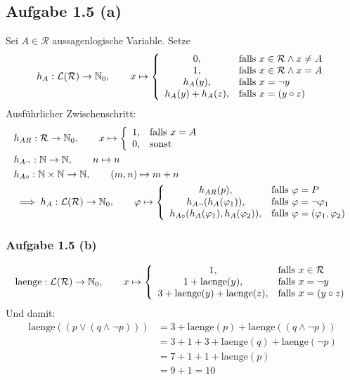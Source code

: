 \subsection*{Aufgabe 1.5 (a)}
Sei $A\in\mathcal{R}$ aussagenlogische Variable. Setze
\begin{align*}
	h_A:\mathcal{L}(\mathcal{R})\to\mathbb{N}_0,\qquad x\mapsto \left\lbrace\begin{array}{cl}
		0, & \text{falls } x\in\mathcal{R}\wedge x\neq A\\
		1, & \text{falls } x\in\mathcal{R}\wedge x=A\\
		h_A(y), & \text{falls } x=\neg y\\
		h_A(y)+h_A(z), & \text{falls } x=(y\circ z)
	\end{array}\right.
\end{align*}
Ausführlicher Zwischenschritt:
\begin{align*}
	&h_{AR}:\mathcal{R}\to\mathbb{N}_0,\qquad x\mapsto \left\lbrace\begin{array}{cl}
		1, & \text{falls } x= A\\
		0, & \text{sonst }
	\end{array}\right.\\
	&h_{A\neg}:\mathbb{N}\to\mathbb{N},\qquad n\mapsto n\\
	&h_{A\circ}:\mathbb{N}\times\mathbb{N}\to\mathbb{N},\qquad(m,n)\mapsto m+n\\
	&\implies h_A:\mathcal{L}(\mathcal{R})\to\mathbb{N}_0,\qquad\varphi\mapsto
	\left\lbrace\begin{array}{cl}
		h_{AR}(p), & \text{falls } \varphi=P\\
		h_{A\neg}(h_A(\varphi_1)), & \text{falls } \varphi=\neg\varphi_1\\
		h_{A\circ}(h_A(\varphi_1),h_A(\varphi_2)), &\text{falls } \varphi=(\varphi_1,\varphi_2)
	\end{array}\right.
\end{align*}

\subsubsection{Aufgabe 1.5 (b)}
\begin{align*}
	\text{laenge}:\mathcal{L}(\mathcal{R})\to\mathbb{N}_0,\qquad x\mapsto \left\lbrace\begin{array}{cl}
		1, & \text{falls } x\in\mathcal{R}\\
		1+\text{laenge}(y), & \text{falls } x=\neg y\\
		3+\text{laenge}(y)+\text{laenge}(z), & \text{falls } x=(y\circ z)
	\end{array}\right.
\end{align*}
Und damit:
\begin{align*}
	\text{laenge}((p\vee(q\wedge\neg p))) 
	&=3+\text{laenge}(p)+\text{laenge}((q\wedge\neg p))\\
	&=3+1+3+\text{laenge}(q)+\text{laenge}(\neg p)\\
	&=7 + 1 + 1+ \text{laenge}(p)\\
	&=9+1=10
\end{align*}

